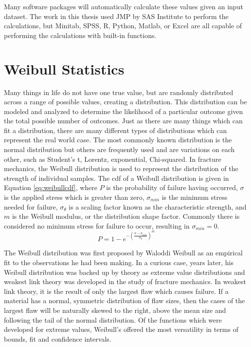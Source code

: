     Many software packages will automatically calculate these values given an input dataset.
    The work in this thesis used JMP by SAS Institute to perform the calculations, but Minitab, SPSS, R, Python, Matlab, or Excel are all capable of performing the calculations with built-in functions.

\section{Weibull Statistics}
    \label{app:weibull}
    Many things in life do not have one true value, but are randomly distributed across a range of possible values, creating a distribution.
    This distribution can be modeled and analyzed to determine the likelihood of a particular outcome given the total possible number of outcomes.
    Just as there are many things which can fit a distribution, there are many different types of distributions which can represent the real world case.
    The most commonly known distribution is the normal distribution but others are frequently used and are variations on each other, such as Student's t, Lorentz, exponential, Chi-squared.
    In fracture mechanics, the Weibull distribution is used to represent the distribution of the strength of individual samples.
    The \gls{cdf} of a Weibull distribution is given in Equation \ref{eq:weibullcdf}, where $P$ is the probability of failure having occurred, $\sigma$ is the applied stress which is greater than zero, $\sigma_{min}$ is the minimum stress needed for failure, $\sigma_\theta$ is a scaling factor known as the characteristic strength, and $m$ is the Weibull modulus, or the distribution shape factor.
    Commonly there is considered no minimum stress for failure to occur, resulting in $\sigma_{min} = 0$.
    \begin{equation}
        \label{eq:weibullcdf}
        P=1-e^{-\left(\frac{\sigma - \sigma_{min}}{\sigma_\theta}\right)^m}
    \end{equation}

    The Weibull distribution was first proposed by Waloddi Weibull as an empirical fit to the observations he had been making.
    In a curious case, years later, his Weibull distribution was backed up by theory as extreme value distributions and weakest link theory was developed in the study of fracture mechanics.
    In weakest link theory, it is the result of only the largest flaw which causes failure.
    If a material has a normal, symmetric distribution of flaw sizes, then the cases of the largest flaw will be naturally skewed to the right, above the mean size and following the tail of the normal distribution.
    Of the functions which were developed for extreme values, Weibull's offered the most versatility in terms of bounds, fit and confidence intervals.


